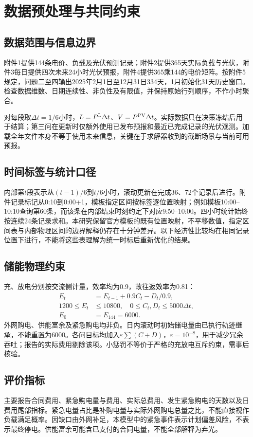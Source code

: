 \section{数据预处理与共同约束}
\subsection{数据范围与信息边界}
附件1提供144条电价、负载及光伏预测记录；附件2提供365天实际负载与光伏，附件3每日提供四次未来24小时光伏预报，附件4提供365乘144的电价矩阵。按附件5规定，问题二至四输出2025年2月1日至12月31日334天，1月初始化31天历史窗口。检查数据维数、日期连续性、非负性及有限值，并保持原始行列顺序，不作小时聚合。

对每段取$\Delta t=1/6$小时，$L=P^{\rm L}\Delta t$、$V=P^{\rm PV}\Delta t$。实际数据只在决策冻结后用于结算；第三问在更新时仅额外使用已发布预报和最近已完成记录的光伏观测。加载全年文件本身不等于使用未来信息，关键在于求解器收到的截断场景与当前可用预报。

\subsection{时间标签与统计口径}
内部第$t$段表示从$(t-1)/6$到$t/6$小时，滚动更新在完成36、72个记录后进行。附件记录标记从0:10到0:00+1，模板指定区间按标签逐位置映射；例如模板10:00--10:10查询第60条，而该条在内部结束时刻约定下对应9:50--10:00。四小时统计始终按连续24条记录求和。本研究保留官方模板的既有位置映射，不平移数值，指定区间表与内部物理区间的边界解释仍存在十分钟差异。以下经济性比较均在相同记录位置下进行，不能将这些表理解为统一时标后重新优化的结果。

\subsection{储能物理约束}
充、放电分别按交流侧计量，效率均为0.9，故往返效率为0.81：
\begin{align}
E_t&=E_{t-1}+0.9C_t-D_t/0.9,\\
1200\leq E_t&\leq10800,\quad 0\leq C_t,D_t\leq5000\Delta t,\\
E_0&=E_{144}=6000.\label{eq:boundary}
\end{align}
外网购电、供能富余及紧急购电均非负。日内滚动时初始储电量由已执行轨迹继承，不能重置为6000。各问目标均加入$\varepsilon\sum(C+D)$，$\varepsilon=10^{-8}$，用于减少冗余吞吐；报告的实际费用剔除该项。小惩罚不等价于严格的充放电互斥约束，需事后核验。

\subsection{评价指标}
主要报告合同费用、紧急购电量与费用、实际总费用、发生紧急购电的天数以及日费用尾部指标。紧急电量占比是补购电量与实际外网购电总量之比，不能直接视作负载满足概率。因缺口由外网补足，本模型中的紧急事件表示计划偏差风险，不表示最终停电。供能富余可能含已支付的合同电量，不能全部解释为弃光。
